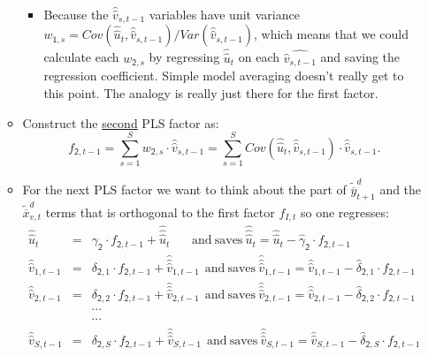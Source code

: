 \documentclass[11pt]{article}
\begin{document}
\begin{itemize}
\begin{itemize}
\begin{itemize}
\item Because the $\widehat{\widehat{v}}_{s,t-1}$ variables have unit variance $w_{\mathsf{1},s}=Cov(\widehat{\widehat{u}}_{t},\widehat{\widehat{v}}_{s,t-1})/Var(\widehat{\widehat{v}}_{s,t-1})$, which means that we could calculate each $w_{\mathsf{2},s}$ by regressing $\widehat{\widehat{u}}_{t}$ on each $\widehat{\widehat{v}_{s,t-1}}$ and saving the regression coefficient.  Simple model averaging doesn't really get to this point.  The analogy is really just there for the first factor.
\end{itemize}
\item Construct the \underline{second} PLS factor as:
\[ f_{\mathsf{2},t-1}=\sum_{s=1}^{S}w_{\mathsf{2},s}\cdot\widehat{\widehat{v}}_{s,t-1}=\sum_{s=1}^{S}Cov(\widehat{\widehat{u}}_{t},\widehat{\widehat{v}}_{s,t-1})\cdot\widehat{\widehat{v}}_{s,t-1}. \]
\item For the next PLS factor we want to think about the part of $\widetilde{\overline{y}}^{d}_{t+1}$ and the $\widetilde{\overline{x}}^{d}_{v,t}$ terms that is orthogonal to the first factor $f_{I,t}$ so one regresses:
\begin{eqnarray}
\widehat{\widehat{u}}_{t}&=&\gamma_{\mathsf{2}}\cdot f_{\mathsf{2},t-1}+\widehat{\widehat{\widehat{u}}}_{t} \ \ \ \ \ \ \  \ \textrm{and} \  \textrm{saves} \  
\widehat{\widehat{\widehat{u}}}_{t}=\widehat{\widehat{u}}_{t}-\widehat{\gamma}_{\mathsf{2}}\cdot f_{\mathsf{2},t-1} \nonumber \\
\widehat{\widehat{v}}_{1,t-1}&=&\delta_{\mathsf{2},1}\cdot f_{\mathsf{2},t-1}+\widehat{\widehat{\widehat{v}}}_{1,t-1} \ \ \textrm{and} \  \textrm{saves} \  
\widehat{\widehat{\widehat{v}}}_{1,t-1}=\widehat{\widehat{v}}_{1,t-1}-\widehat{\delta}_{\mathsf{2},1}\cdot f_{\mathsf{2},t-1}  \nonumber \\
\widehat{\widehat{v}}_{2,t-1}&=&\delta_{\mathsf{2},2}\cdot f_{\mathsf{2},t-1}+\widehat{\widehat{\widehat{v}}}_{2,t-1} \ \ \textrm{and} \  \textrm{saves} \  
\widehat{\widehat{\widehat{v}}}_{2,t-1}=\widehat{\widehat{v}}_{2,t-1}-\widehat{\delta}_{\mathsf{2},2}\cdot f_{\mathsf{2},t-1}  \nonumber \\
&&\cdots  \nonumber \\
&&\cdots  \nonumber \\
\widehat{\widehat{v}}_{S,t-1}&=&\delta_{\mathsf{2},S}\cdot f_{\mathsf{2},t-1}+\widehat{\widehat{\widehat{v}}}_{S,t-1} \ \ \textrm{and} \  \textrm{saves} \  
\widehat{\widehat{\widehat{v}}}_{S,t-1}=\widehat{\widehat{v}}_{S,t-1}-\widehat{\delta}_{\mathsf{2},S}\cdot f_{\mathsf{2},t-1} \nonumber 

\end{eqnarray}
\end{itemize}
\end{itemize}
\end{document}
